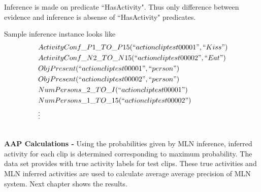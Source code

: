 Inference is made on predicate ``HasActivity". Thus only difference
between evidence and inference is absense of ``HasActivity" predicates.

Sample inference instance looks like
\begin{equation}
	\begin{split}
		~ & ActivityConf\_P1\_TO\_P15(``actioncliptest00001",``Kiss") \\
		~ & ActivityConf\_N2\_TO\_N15(``actioncliptest00002",``Eat") \\
		~ & ObjPresent(``actioncliptest00001",``person") \\
		~ & ObjPresent(``actioncliptest00002",``person") \\
		~ & NumPersons\_2\_TO\_I(``actioncliptest00001") \\
		~ & NumPersons\_1\_TO\_15(``actioncliptest00002") \\
		~ & \vdots
	\end{split}
\end{equation}

\\
{\bf AAP Calculations - }Using the probabilities given by MLN inference, inferred activity for each
clip is determined corresponding to maximum probability. The data set provides with true activity labels for test clips. 
These true activities and MLN inferred activities are used to calculate average average precision
of MLN system. Next chapter shows the results.

